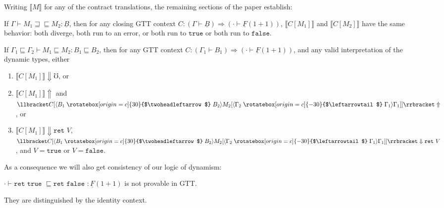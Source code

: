 \documentclass[acmsmall,nonacm]{acmart}
\newif\iflong
\renewcommand{\u}{\underline}
\newcommand{\sem}[1]{\llbracket#1\rrbracket}
\newcommand{\ltdyn}{\sqsubseteq}
\newcommand{\gtdyn}{\sqsupseteq}
\newcommand{\equidyn}{\mathrel{\gtdyn\ltdyn}}
\newcommand{\tru}{\texttt{true}}
\newcommand{\fls}{\texttt{false}}
\newcommand{\uarrow}{\mathrel{\rotatebox[origin=c]{-30}{$\leftarrowtail$}}}
\newcommand{\darrow}{\mathrel{\rotatebox[origin=c]{30}{$\twoheadleftarrow$}}}
\newcommand{\upcast}[2]{\langle{#2}\uarrow{#1}\rangle}
\newcommand{\dncast}[2]{\langle{#1}\darrow{#2}\rangle}
\newcommand{\err}{\mho}
\newcommand{\kw}[1]{\texttt{#1}\,\,}
\newcommand{\ret}{\kw{ret}}
\begin{document}
Writing $\sem{M}$ for any of the contract translations, the remaining
sections of the paper establish:
\begin{theorem}
  If $\Gamma \vdash M_1 \equidyn M_2 : \u B$, then for any closing
  GTT context $C : (\Gamma \vdash \u B) \Rightarrow (\cdot \vdash \u F
  (1+1))$, $\sem{C[M_1]}$ and $\sem{C[M_2]}$ have the same behavior: both diverge,
  both run to an error, or both run to $\tru$ or both run to $\fls$.
\end{theorem}
\begin{theorem}[Graduality]
  If $\Gamma_1 \ltdyn \Gamma_2 \vdash M_1 \ltdyn M_2 : B_1 \ltdyn B_2$,
  then for any GTT context $C : (\Gamma_1 \vdash B_1) \Rightarrow (\cdot
  \vdash \u F (1+1))$, and any valid interpretation of the dynamic
  types, either
  \begin{enumerate}
  \item $\sem{C[M_1]} \Downarrow \err$, or
  \item $\sem{C[M_1]} \Uparrow$ and $\sem{C[\dncast{B_1}{B_2}M_2[\upcast{\Gamma_1}{\Gamma_2}{\Gamma_1}]]} \Uparrow$, or
  \item $\sem{C[M_1]} \Downarrow \ret V$,~~
    $\sem{C[\dncast{B_1}{B_2}M_2[\upcast{\Gamma_1}{\Gamma_2}{\Gamma_1}]]} 
    \Downarrow \ret V$, and $V = \tru$ or $V = \fls$.
  \end{enumerate}
\end{theorem}

As a consequence we will also get consistency of our logic of
dynamism:
\begin{corollary}[Consistency \iflong of GTT \fi]
  $\cdot \vdash \ret \kw{true} \ltdyn \ret \kw{false} : \u F(1+1)$ is not
  provable in GTT.
\end{corollary}
\begin{longproof}
  They are distinguished by the identity context.
\end{longproof}
\end{document}
